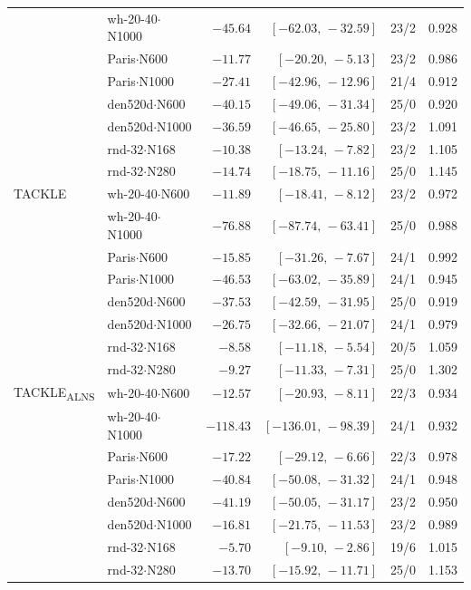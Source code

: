 \begin{table}[t]
\begin{tabular}{@{}llrrrr@{}}
 & wh-20-40$\cdot$N1000 & $-45.64$ & $[-62.03,\,-32.59]$ & 23/2 & 0.928 \\
 & Paris$\cdot$N600 & $-11.77$ & $[-20.20,\,-5.13]$ & 23/2 & 0.986 \\
 & Paris$\cdot$N1000 & $-27.41$ & $[-42.96,\,-12.96]$ & 21/4 & 0.912 \\
 & den520d$\cdot$N600 & $-40.15$ & $[-49.06,\,-31.34]$ & 25/0 & 0.920 \\
 & den520d$\cdot$N1000 & $-36.59$ & $[-46.65,\,-25.80]$ & 23/2 & 1.091 \\
 & rnd-32$\cdot$N168 & $-10.38$ & $[-13.24,\,-7.82]$ & 23/2 & 1.105 \\
 & rnd-32$\cdot$N280 & $-14.74$ & $[-18.75,\,-11.16]$ & 25/0 & 1.145 \\
\midrule
TACKLE & wh-20-40$\cdot$N600 & $-11.89$ & $[-18.41,\,-8.12]$ & 23/2 & 0.972 \\
 & wh-20-40$\cdot$N1000 & $-76.88$ & $[-87.74,\,-63.41]$ & 25/0 & 0.988 \\
 & Paris$\cdot$N600 & $-15.85$ & $[-31.26,\,-7.67]$ & 24/1 & 0.992 \\
 & Paris$\cdot$N1000 & $-46.53$ & $[-63.02,\,-35.89]$ & 24/1 & 0.945 \\
 & den520d$\cdot$N600 & $-37.53$ & $[-42.59,\,-31.95]$ & 25/0 & 0.919 \\
 & den520d$\cdot$N1000 & $-26.75$ & $[-32.66,\,-21.07]$ & 24/1 & 0.979 \\
 & rnd-32$\cdot$N168 & $-8.58$ & $[-11.18,\,-5.54]$ & 20/5 & 1.059 \\
 & rnd-32$\cdot$N280 & $-9.27$ & $[-11.33,\,-7.31]$ & 25/0 & 1.302 \\
\midrule
TACKLE\textsubscript{ALNS} & wh-20-40$\cdot$N600 & $-12.57$ & $[-20.93,\,-8.11]$ & 22/3 & 0.934 \\
 & wh-20-40$\cdot$N1000 & $-118.43$ & $[-136.01,\,-98.39]$ & 24/1 & 0.932 \\
 & Paris$\cdot$N600 & $-17.22$ & $[-29.12,\,-6.66]$ & 22/3 & 0.978 \\
 & Paris$\cdot$N1000 & $-40.84$ & $[-50.08,\,-31.32]$ & 24/1 & 0.948 \\
 & den520d$\cdot$N600 & $-41.19$ & $[-50.05,\,-31.17]$ & 23/2 & 0.950 \\
 & den520d$\cdot$N1000 & $-16.81$ & $[-21.75,\,-11.53]$ & 23/2 & 0.989 \\
 & rnd-32$\cdot$N168 & $-5.70$ & $[-9.10,\,-2.86]$ & 19/6 & 1.015 \\
 & rnd-32$\cdot$N280 & $-13.70$ & $[-15.92,\,-11.71]$ & 25/0 & 1.153 \\
\bottomrule
\end{tabular}
\end{table}
